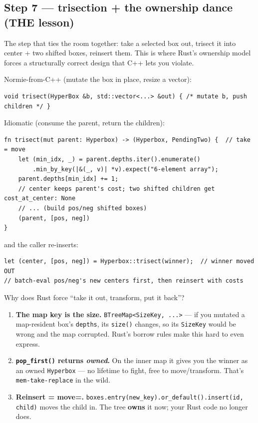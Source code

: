 \documentclass[11pt]{article}
\begin{document}
\subsection{Step 7 — trisection + the ownership dance (THE lesson)}
\label{sec:orgdfb30e2}

The step that ties the room together: take a selected box out, trisect it into
center + two shifted boxes, reinsert them. This is where Rust's ownership model
forces a structurally correct design that C++ lets you violate.

Normie-from-C++ (mutate the box in place, resize a vector):
\begin{verbatim}
void trisect(HyperBox &b, std::vector<...> &out) { /* mutate b, push children */ }
\end{verbatim}

Idiomatic (consume the parent, return the children):
\begin{verbatim}
fn trisect(mut parent: Hyperbox) -> (Hyperbox, PendingTwo) {  // take = move
    let (min_idx, _) = parent.depths.iter().enumerate()
        .min_by_key(|&(_, v)| *v).expect("6-element array");
    parent.depths[min_idx] += 1;
    // center keeps parent's cost; two shifted children get cost_at_center: None
    // ... (build pos/neg shifted boxes)
    (parent, [pos, neg])
}
\end{verbatim}

and the caller re-inserts:
\begin{verbatim}
let (center, [pos, neg]) = Hyperbox::trisect(winner);  // winner moved OUT
// batch-eval pos/neg's new centers first, then reinsert with costs
\end{verbatim}

Why does Rust force ``take it out, transform, put it back''?

\begin{enumerate}
\item \textbf{\textbf{The map key is the size.}} \texttt{BTreeMap<SizeKey, ...>} — if you mutated a
map-resident box's \texttt{depths}, its \texttt{size()} changes, so its \texttt{SizeKey} would be
wrong and the map corrupted. Rust's borrow rules make this hard to even
express.
\item \textbf{\textbf{\texttt{pop\_first()} returns \emph{owned}.}} On the inner map it gives you the winner
as an owned \texttt{Hyperbox} — no lifetime to fight, free to move/transform. That's
\texttt{mem-take-replace} in the wild.
\item \textbf{\textbf{Reinsert = move=.}} \texttt{boxes.entry(new\_key).or\_default().insert(id, child)}
moves the child in. The tree \textbf{owns} it now; your Rust code no longer does.
\end{enumerate}
\end{document}
